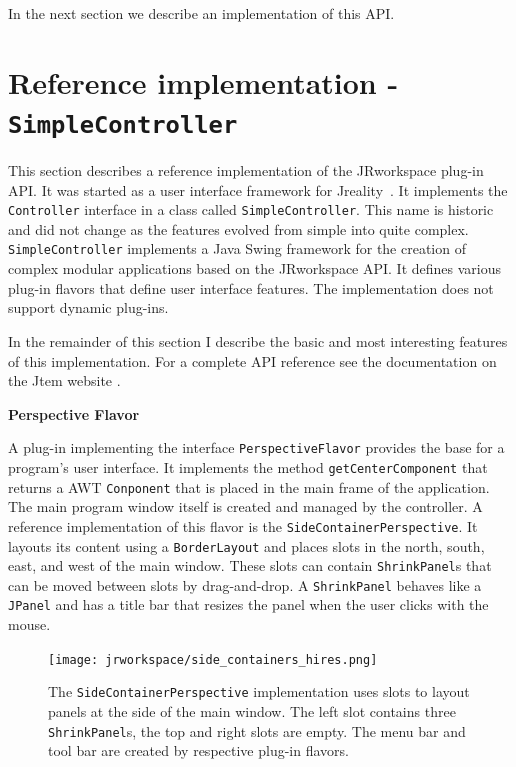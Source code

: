 \documentclass[Thesis.tex]{subfiles}
\begin{document}
In the next section we describe an implementation of this API.

\section{Reference implementation - {\tt SimpleController}}
\label{sec:reference_implementation}
This section describes a reference implementation of the {\sc JRworkspace} plug-in API.
It was started as a user interface framework for {\sc Jreality}~\cite{JrealityWebsite}. It implements
the {\tt Controller} interface in a class called {\tt SimpleController}. This name is historic
and did not change as the features evolved from simple into quite complex.
{\tt SimpleController} implements a {\sc Java Swing\TReg} framework for the creation of complex
modular applications based on the {\sc JRworkspace} API. It defines various plug-in flavors
that define user interface features. The implementation does not support dynamic plug-ins.

In the remainder of this section I describe the basic and most interesting features of this 
implementation. For a complete API reference see the documentation on the {\sc Jtem} website 
\cite{JtemWebsite}.


{\bf Perspective Flavor}

A plug-in implementing the interface {\tt PerspectiveFlavor} provides the base for a program's user 
interface. It implements the method {\tt getCenterComponent} that returns a AWT {\tt Conponent}
that is placed in the main frame of the application. The main program window itself is created and
managed by the controller.
A reference implementation of this flavor is the {\tt SideContainerPerspective}. It layouts its content 
using a {\tt BorderLayout} and places slots in the north, south, east, and west of the main window. These
slots can contain {\tt ShrinkPanel}s that can be moved between slots by drag-and-drop. A {\tt ShrinkPanel}
behaves like a {\tt JPanel} and has a title bar that resizes the panel when the user clicks with the mouse.

\begin{figure}[H]
\centering
\texttt{[image: jrworkspace/side\_containers\_hires.png]}
\caption[The {\tt SideContainerPerspective} user interface plug-in]{The {\tt SideContainerPerspective} implementation uses slots to layout panels at the side of the
main window. The left slot contains three {\tt ShrinkPanel}s, the top and right slots are empty. The menu bar 
and tool bar are created by respective plug-in flavors.}
\label{fig:side_containers}
\end{figure}
\end{document}
